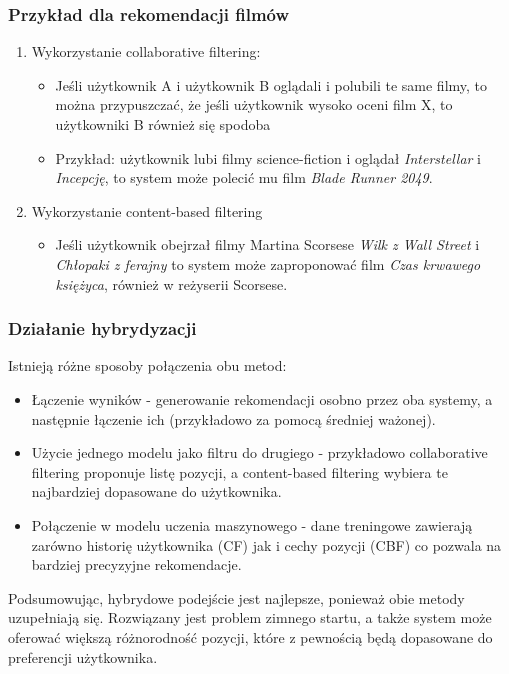 \documentclass{article}
\begin{document}
\subsubsection{Przykład dla rekomendacji filmów}
\begin{enumerate}
    \item Wykorzystanie collaborative filtering:
    \begin{itemize}
        \item Jeśli użytkownik A i użytkownik B oglądali i polubili te same filmy, to można przypuszczać, że jeśli użytkownik wysoko oceni  film X, to użytkowniki B również się spodoba
        \item Przykład: użytkownik lubi filmy science-fiction i oglądał \textit{Interstellar} i \textit{Incepcję}, to system może polecić mu film \textit{Blade Runner 2049}.
    \end{itemize}

    \item Wykorzystanie content-based filtering
    \begin{itemize}
        \item Jeśli użytkownik obejrzał filmy Martina Scorsese \textit{Wilk z Wall Street} i \textit{Chłopaki z ferajny} to system może zaproponować film \textit{Czas krwawego księżyca}, również w reżyserii Scorsese. 
    \end{itemize}
\end{enumerate}

\subsubsection{Działanie hybrydyzacji}
Istnieją różne sposoby połączenia obu metod:
\begin{itemize}
    \item Łączenie wyników - generowanie rekomendacji osobno przez oba systemy, a następnie łączenie ich (przykładowo za pomocą średniej ważonej).
    \item Użycie jednego modelu jako filtru do drugiego - przykładowo collaborative filtering proponuje listę pozycji, a content-based filtering wybiera te najbardziej dopasowane do użytkownika.
    \item Połączenie w modelu uczenia maszynowego - dane treningowe zawierają zarówno historię użytkownika (CF) jak i cechy pozycji (CBF) co pozwala na bardziej precyzyjne rekomendacje.
\end{itemize}
Podsumowując, hybrydowe podejście jest najlepsze, ponieważ obie metody uzupełniają się. Rozwiązany jest problem zimnego startu, a także system może oferować większą różnorodność pozycji, które z pewnością będą dopasowane do preferencji użytkownika.
\end{document}
